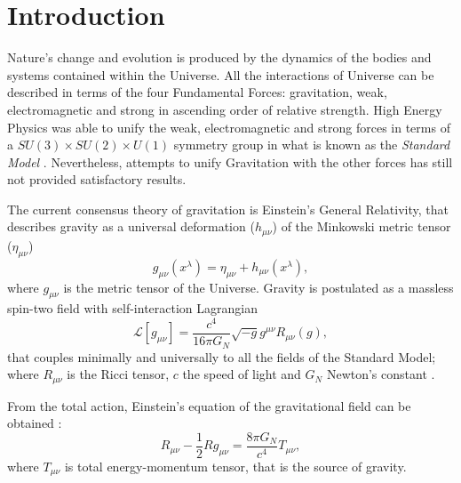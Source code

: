 \chapter{Introduction}
\label{ch:introduction}
Nature's change and evolution is produced by the dynamics of the bodies and systems contained within the Universe. All the interactions of Universe can be described in terms of the four Fundamental Forces: gravitation, weak, electromagnetic and strong in ascending order of relative strength. High Energy Physics was able to unify the weak, electromagnetic and strong forces in terms of a $SU(3)\times SU(2)\times U(1)$ symmetry group in what is known as the {\it Standard Model} \cite{halzen1984quarks,peskin1995introduction,weinberg1995quantum,weinberg1996quantum,2000hep.ph....1283N}. Nevertheless, attempts to unify Gravitation with the other forces has still not provided satisfactory results.
\newline

The current consensus theory of gravitation is Einstein's General Relativity, that describes gravity as a universal deformation ($h_{\mu\nu}$) of the Minkowski metric tensor ($\eta_{\mu\nu}$)
\begin{equation}
g_{\mu\nu}(x^\lambda) = \eta_{\mu\nu}+h_{\mu\nu}(x^\lambda),
\end{equation}
where $g_{\mu\nu}$ is the metric tensor of the Universe. Gravity is postulated as a massless spin-two field with self-interaction Lagrangian
\begin{equation}
\mathcal{L}[g_{\mu\nu}] = \frac{c^4}{16\pi G_N}\sqrt{-g}g^{\mu\nu}R_{\mu\nu}(g),
\end{equation}
that couples minimally and universally to all the fields of the Standard Model; where $R_{\mu\nu}$ is the Ricci tensor, $c$ the speed of light and $G_N$ Newton's constant \cite{PhysRev.138.B988,feynman1995feynman,1969ApJ...157..857F,PhysRevD.33.3613,0264-9381-4-5-024,0264-9381-4-5-025,Olive:2016xmw}.
\newline

From the total action, Einstein's equation of the gravitational field can be obtained \cite{ANDP:ANDP19163540702,1916AnP...354..769E}:
\begin{equation}
R_{\mu\nu}-\frac{1}{2}Rg_{\mu\nu} = \frac{8\pi G_N}{c^4}T_{\mu\nu},
\label{eq:einsteinbare}
\end{equation}
where $T_{\mu\nu}$ is total energy-momentum tensor, that is the source of gravity.

